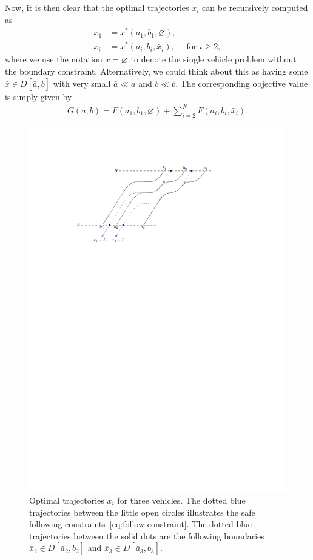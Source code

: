\documentclass[a4paper]{article}
\theoremstyle{definition}
\theoremstyle{plain}
\begin{document}
Now, it is then clear that the optimal trajectories $x_{i}$ can be
recursively computed as
\begin{subequations}
\begin{align}
  x_{1} &= x^{*}(a_{1}, b_{1}, \varnothing) , \\
  x_{i} &= x^{*}(a_{i}, b_{i}, \bar{x}_{i})  ,  \quad \text{ for } i \geq 2 ,
\end{align}
\end{subequations}
%
where we use the notation $\bar{x} = \varnothing$ to denote the single vehicle problem
without the boundary constraint. Alternatively, we could think about this as
having some $\bar{x} \in \bar{D}[\bar{a},\bar{b}]$ with very small $\bar{a} \ll a$
and $\bar{b} \ll b$.
%
The corresponding objective value is simply given by
\begin{align}
  G(a, b) = F(a_{1}, b_{1}, \varnothing) + \sum_{i=2}^{N} F(a_{i}, b_{i}, \bar{x}_{i}) .
\end{align}

\begin{figure}
  \centering
  \includegraphics[scale=1.0]{figures/motion/rough/solution}
  \caption{Optimal trajectories $x_{i}$ for three vehicles. The dotted blue
    trajectories between the little open circles illustrates the safe following
    constraints~\eqref{eq:follow-constraint}. The dotted blue trajectories between
    the solid dots are the following boundaries
    $\bar{x}_{2} \in \bar{D}[\bar{a}_{2}, \bar{b}_{2}]$ and
    $\bar{x}_{3} \in \bar{D}[\bar{a}_{3}, \bar{b}_{3}]$.}%
  \label{fig:solution}
\end{figure}
\end{document}
